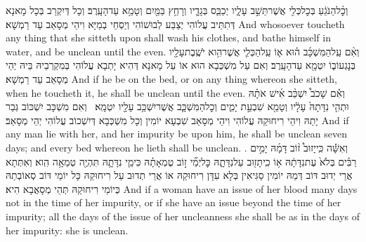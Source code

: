 {וְכׇ֨ל\maqqaf הַנֹּגֵ֔עַ בְּכׇל\maqqaf כְּלִ֖י אֲשֶׁר\maqqaf תֵּשֵׁ֣ב עָלָ֑יו יְכַבֵּ֧ס בְּגָדָ֛יו וְרָחַ֥ץ בַּמַּ֖יִם וְטָמֵ֥א עַד\maqqaf הָעָֽרֶב׃}
{וְכָל דְּיִקְרַב בְּכָל מָאנָא דְּתִתֵּיב עֲלוֹהִי יְצַבַּע לְבוּשׁוֹהִי וְיַסְחֵי בְמַיָּא וִיהֵי מְסָאַב עַד רַמְשָׁא׃}
{And whosoever toucheth any thing that she sitteth upon shall wash his clothes, and bathe himself in water, and be unclean until the even.}{}
{וְאִ֨ם עַֽל\maqqaf הַמִּשְׁכָּ֜ב ה֗וּא א֧וֹ עַֽל\maqqaf הַכְּלִ֛י אֲשֶׁר\maqqaf הִ֥וא יֹשֶֽׁבֶת\maqqaf עָלָ֖יו בְּנׇגְעוֹ\maqqaf ב֑וֹ יִטְמָ֖א עַד\maqqaf הָעָֽרֶב׃}
{וְאִם עַל מִשְׁכְּבָא הוּא אוֹ עַל מָאנָא דְּהִיא יָתְבָא עֲלוֹהִי בְּמִקְרְבֵיהּ בֵּיהּ יְהֵי מְסָאַב עַד רַמְשָׁא׃}
{And if he be on the bed, or on any thing whereon she sitteth, when he toucheth it, he shall be unclean until the even.}{}
{וְאִ֡ם שָׁכֹב֩ יִשְׁכַּ֨ב אִ֜ישׁ אֹתָ֗הּ וּתְהִ֤י נִדָּתָהּ֙ עָלָ֔יו וְטָמֵ֖א שִׁבְעַ֣ת יָמִ֑ים וְכׇל\maqqaf הַמִּשְׁכָּ֛ב אֲשֶׁר\maqqaf יִשְׁכַּ֥ב עָלָ֖יו יִטְמָֽא׃ \setuma }
{וְאִם מִשְׁכָּב יִשְׁכּוֹב גְּבַר יָתַהּ וִיהֵי רִיחוּקַהּ עֲלוֹהִי וִיהֵי מְסָאַב שִׁבְעָא יוֹמִין וְכָל מִשְׁכְּבָא דְּיִשְׁכוֹב עֲלוֹהִי יְהֵי מְסָאַב׃}
{And if any man lie with her, and her impurity be upon him, he shall be unclean seven days; and every bed whereon he lieth shall be unclean. .}{}
{וְאִשָּׁ֡ה כִּֽי\maqqaf יָזוּב֩ ז֨וֹב דָּמָ֜הּ יָמִ֣ים רַבִּ֗ים בְּלֹא֙ עֶת\maqqaf נִדָּתָ֔הּ א֥וֹ כִֽי\maqqaf תָז֖וּב עַל\maqqaf נִדָּתָ֑הּ כׇּל\maqqaf יְמֵ֞י ז֣וֹב טֻמְאָתָ֗הּ כִּימֵ֧י נִדָּתָ֛הּ תִּהְיֶ֖ה טְמֵאָ֥ה הִֽוא׃}
{וְאִתְּתָא אֲרֵי יְדוּב דּוֹב דְּמַהּ יוֹמִין סַגִּיאִין בְּלָא עִדָּן רִיחוּקַהּ אוֹ אֲרֵי תְדוּב עַל רִיחוּקַהּ כָּל יוֹמֵי דּוֹב סְאוֹבְתַהּ כְּיוֹמֵי רִיחוּקַהּ תְּהֵי מְסָאֲבָא הִיא׃}
{And if a woman have an issue of her blood many days not in the time of her impurity, or if she have an issue beyond the time of her impurity; all the days of the issue of her uncleanness she shall be as in the days of her impurity: she is unclean.}{}
